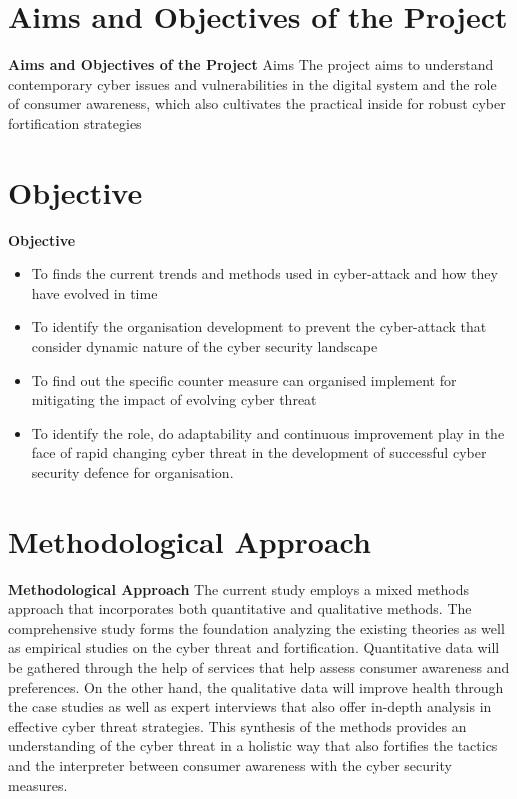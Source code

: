 
\section{Aims and Objectives of the Project}
\label{sec:into_back}
\textbf{Aims and Objectives of the Project}
Aims
The project aims to understand contemporary cyber issues and vulnerabilities in the digital 
system and the role of consumer awareness, which also cultivates the practical inside for 
robust cyber fortification strategies



\section{Objective}
\label{sec:into_back}
\textbf{Objective}
\begin{itemize}
    \item To finds the current trends and methods used in cyber-attack and how they have evolved in time
    \item To identify the organisation development to prevent the cyber-attack that consider dynamic nature of the cyber security landscape
    \item To find out the specific counter measure can organised implement for mitigating the impact of evolving cyber threat
    \item To identify the role, do adaptability and continuous improvement play in the face of rapid changing cyber threat in the development of successful cyber security defence for organisation.
\end{itemize}


\section{Methodological Approach}
\label{sec:into_back}
\textbf{Methodological Approach}
The current study employs a mixed methods approach that incorporates both quantitative and 
qualitative methods. The comprehensive study forms the foundation analyzing the existing 
theories as well as empirical studies on the cyber threat and fortification. Quantitative data 
will be gathered through the help of services that help assess consumer awareness and 
preferences. On the other hand, the qualitative data will improve health through the case 
studies as well as expert interviews that also offer in-depth analysis in effective cyber 
threat strategies. This synthesis of the methods provides an understanding of the cyber threat 
in a holistic way that also fortifies the tactics and the interpreter between consumer 
awareness with the cyber security measures.






